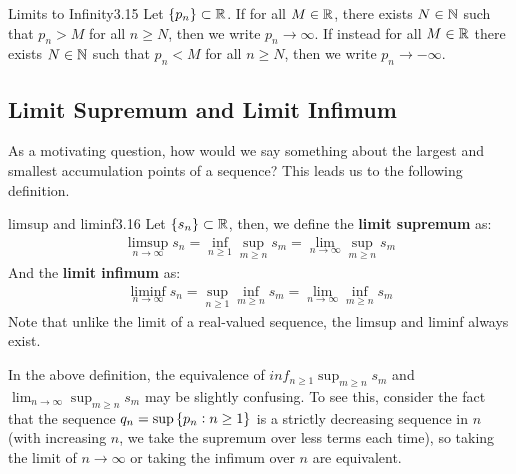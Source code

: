 \begin{definition}{Limits to Infinity}{3.15}
    Let $\set{p_n} \subset \mathbb{R}$. If for all $M \in \mathbb{R}$, there exists $N \in \mathbb{N}$ such that $p_n > M$ for all $n \geq N$, then we write $p_n \rightarrow \infty$. If instead for all $M \in \mathbb{R}$ there exists $N \in \mathbb{N}$ such that $p_n < M$ for all $n \geq N$, then we write $p_n \rightarrow -\infty$.
\end{definition}



\subsection{Limit Supremum and Limit Infimum}
As a motivating question, how would we say something about the largest and smallest accumulation points of a sequence? This leads us to the following definition.
\begin{definition}{limsup and liminf}{3.16}
    Let $\set{s_n} \subset \mathbb{R}$, then, we define the \textbf{limit supremum} as:
    \begin{align*}
        \limsup_{n \rightarrow \infty} s_n = \inf_{n \geq 1}\sup_{m \geq n} s_m = \lim_{n \rightarrow \infty} \sup_{m \geq n} s_m
    \end{align*}
    And the \textbf{limit infimum} as:
    \begin{align*}
        \liminf_{n \rightarrow \infty} s_n = \sup_{n \geq 1}\inf_{m \geq n} s_m = \lim_{n \rightarrow \infty} \inf_{m \geq n} s_m
    \end{align*}
    Note that unlike the limit of a real-valued sequence, the limsup and liminf always exist.
\end{definition}

\noindent In the above definition, the equivalence of $inf_{n \geq 1}\sup_{m \geq n} s_m$ and $\lim_{n \rightarrow \infty} \sup_{m \geq n} s_m$ may be slightly confusing. To see this, consider the fact that the sequence $q_n = \sup \set{p_n: n \geq 1}$ is a strictly decreasing sequence in $n$ (with increasing $n$, we take the supremum over less terms each time), so taking the limit of $n \rightarrow \infty$ or taking the infimum over $n$ are equivalent. 

